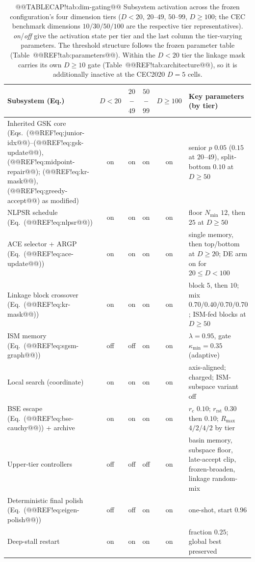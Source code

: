 \documentclass[10pt,a4paper]{article}
\begin{document}
\begin{table}[t]
\caption{@@TABLECAP!tab:dim-gating@@ Subsystem activation across the frozen configuration's four
dimension tiers ($D<20$, $20$--$49$, $50$--$99$, $D\geq100$; the CEC benchmark
dimensions $10/30/50/100$ are the respective tier representatives).
\emph{on}/\emph{off} give the activation state per tier and the last column the
tier-varying parameters. The threshold structure follows the frozen parameter
table (Table~@@REF!tab:parameters@@). Within the $D{<}20$ tier the linkage mask
carries its own $D\geq10$ gate (Table~@@REF!tab:architecture@@), so it is
additionally inactive at the CEC2020 $D=5$ cells.}
\label{tab:dim-gating}
\footnotesize
\zebra
\begin{tabular}{p{3.2cm}cccc p{3.9cm}}
\toprule
\textbf{Subsystem (Eq.)} & \textbf{$D{<}20$} & \textbf{$20$--$49$} & \textbf{$50$--$99$} & \textbf{$D{\ge}100$} & \textbf{Key parameters (by tier)} \\
\midrule
Inherited GSK core (Eqs.~(@@REF!eq:junior-idx@@)--(@@REF!eq:gsk-update@@), (@@REF!eq:midpoint-repair@@); (@@REF!eq:kr-mask@@), (@@REF!eq:greedy-accept@@) as modified) & on & on & on & on & senior $p$ $0.05$ ($0.15$ at $20$--$49$), split-bottom $0.10$ at $D{\ge}50$ \\
NLPSR schedule (Eq.~(@@REF!eq:nlpsr@@)) & on & on & on & on & floor $N_{\min}$ $12$, then $25$ at $D{\ge}50$ \\
ACE selector + ARGP (Eq.~(@@REF!eq:ace-update@@)) & on & on & on & on & single memory, then top/bottom at $D{\ge}20$; DE arm on for $20{\le}D{<}100$ \\
Linkage block crossover (Eq.~(@@REF!eq:kr-mask@@)) & on & on & on & on & block $5$, then $10$; mix $0.70/0.40/0.70/0.70$; ISM-fed blocks at $D{\ge}50$ \\
ISM memory (Eq.~(@@REF!eq:sgsm-graph@@)) & off & off & on & on & $\lambda{=}0.95$, gate $\kappa_{\min}{=}0.35$ (adaptive) \\
Local search (coordinate) & on & on & on & on & axis-aligned; charged; ISM-subspace variant off \\
BSE escape (Eq.~(@@REF!eq:bse-cauchy@@)) + archive & on & on & on & on & $r_{c}$ $0.10$; $r_{\mathrm{rst}}$ $0.30$ then $0.10$; $R_{\max}$ $4/2/4/2$ by tier \\
Upper-tier controllers & off & off & off & on & basin memory, subspace floor, late-accept clip, frozen-broaden, linkage random-mix \\
Deterministic final polish (Eq.~(@@REF!eq:eigen-polish@@)) & off & off & on & on & one-shot, start $0.96$ \\
Deep-stall restart & on & on & on & on & fraction $0.25$; global best preserved \\
\bottomrule
\end{tabular}
\end{table}
\end{document}
